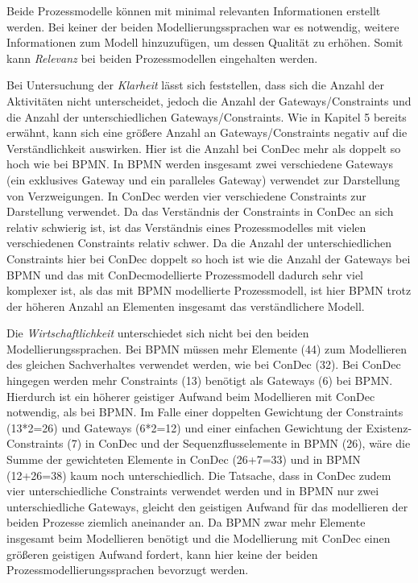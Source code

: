 Beide Prozessmodelle können mit minimal relevanten Informationen erstellt werden. Bei keiner der beiden Modellierungssprachen war es notwendig, weitere Informationen zum Modell hinzuzufügen, um dessen Qualität zu erhöhen. Somit kann \textit{Relevanz} bei beiden Prozessmodellen eingehalten werden.\newline




Bei Untersuchung der \textit{Klarheit} lässt sich feststellen, dass sich die Anzahl der Aktivitäten nicht unterscheidet, jedoch die Anzahl der Gateways/Constraints und die Anzahl der unterschiedlichen Gateways/Constraints. Wie in Kapitel 5 bereits erwähnt, kann sich eine größere Anzahl an Gateways/Constraints negativ auf die Verständlichkeit auswirken. Hier ist die Anzahl bei ConDec mehr als doppelt so hoch wie bei BPMN. In BPMN werden insgesamt zwei verschiedene Gateways (ein exklusives Gateway und ein paralleles Gateway) verwendet zur Darstellung von Verzweigungen. In ConDec werden vier verschiedene Constraints zur Darstellung verwendet. Da das Verständnis der Constraints in ConDec an sich relativ schwierig ist, ist das Verständnis eines Prozessmodelles mit vielen verschiedenen Constraints relativ schwer. Da die Anzahl der unterschiedlichen Constraints hier bei ConDec doppelt so hoch ist wie die Anzahl der Gateways bei BPMN und das mit ConDecmodellierte Prozessmodell dadurch sehr viel komplexer ist, als das mit BPMN modellierte Prozessmodell, ist hier BPMN trotz der höheren Anzahl an Elementen insgesamt das verständlichere Modell.\newline

Die \textit{Wirtschaftlichkeit} unterschiedet sich nicht bei den beiden Modellierungssprachen. Bei BPMN müssen mehr Elemente (44) zum Modellieren des gleichen Sachverhaltes verwendet werden, wie bei ConDec (32). Bei ConDec hingegen werden mehr Constraints (13) benötigt als Gateways (6) bei BPMN. Hierdurch ist ein höherer geistiger Aufwand beim Modellieren mit ConDec notwendig, als bei BPMN. Im Falle einer doppelten Gewichtung der Constraints (13*2=26) und Gateways (6*2=12) und einer einfachen Gewichtung der Existenz-Constraints (7) in ConDec und der Sequenzflusselemente in BPMN (26), wäre die Summe der gewichteten Elemente in ConDec (26+7=33) und in BPMN (12+26=38) kaum noch unterschiedlich. Die Tatsache, dass in ConDec zudem vier unterschiedliche Constraints verwendet werden und in BPMN nur zwei unterschiedliche Gateways, gleicht den geistigen Aufwand für das modellieren der beiden Prozesse ziemlich aneinander an. \newline
Da BPMN zwar mehr Elemente insgesamt beim Modellieren benötigt und die Modellierung mit ConDec einen größeren geistigen Aufwand fordert, kann hier keine der beiden Prozessmodellierungssprachen bevorzugt werden.\newline

